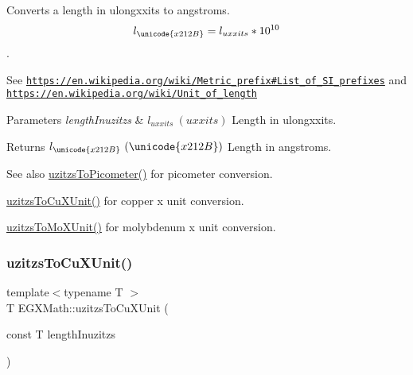 Converts a length in ulongxxits to angstroms. \[ l_{\unicode{x212B}}=l_{uxxits} * 10^{10} \].

See \href{https://en.wikipedia.org/wiki/Metric_prefix#List_of_SI_prefixes}{\tt https\+://en.\+wikipedia.\+org/wiki/\+Metric\+\_\+prefix\#\+List\+\_\+of\+\_\+\+S\+I\+\_\+prefixes} and \href{https://en.wikipedia.org/wiki/Unit_of_length}{\tt https\+://en.\+wikipedia.\+org/wiki/\+Unit\+\_\+of\+\_\+length} 
\begin{DoxyParams}{Parameters}
{\em length\+Inuzitzs} & $ l_{uxxits}\ (uxxits)$ Length in ulongxxits. \\
\hline
\end{DoxyParams}
\begin{DoxyReturn}{Returns}
$ l_{\unicode{x212B}}\ (\unicode{x212B})$ Length in angstroms. 
\end{DoxyReturn}
\begin{DoxySeeAlso}{See also}
\mbox{\hyperlink{group___e_g_x_math-_conversions-_length_conversions-_imperial-uzitzs-_s_i_ga48c60a4876ac426d1717096263648a4d}{uzitzs\+To\+Picometer()}} for picometer conversion. 

\mbox{\hyperlink{group___e_g_x_math-_conversions-_length_conversions-_imperial-uzitzs-_non-_s_i_gab25470e41b88c41d4bf32622baa6c472}{uzitzs\+To\+Cu\+X\+Unit()}} for copper x unit conversion. 

\mbox{\hyperlink{group___e_g_x_math-_conversions-_length_conversions-_imperial-uzitzs-_non-_s_i_ga64b556911b0bb06cf315aa02f5e2d379}{uzitzs\+To\+Mo\+X\+Unit()}} for molybdenum x unit conversion. 
\end{DoxySeeAlso}
\mbox{\label{group___e_g_x_math-_conversions-_length_conversions-_imperial-uzitzs-_non-_s_i_gab25470e41b88c41d4bf32622baa6c472}} 
\subsubsection{\texorpdfstring{uzitzs\+To\+Cu\+X\+Unit()}{uzitzsToCuXUnit()}}
{\footnotesize\ttfamily template$<$typename T $>$ \\
T E\+G\+X\+Math\+::uzitzs\+To\+Cu\+X\+Unit (\begin{DoxyParamCaption}\item[{const T}]{length\+Inuzitzs }\end{DoxyParamCaption})}



